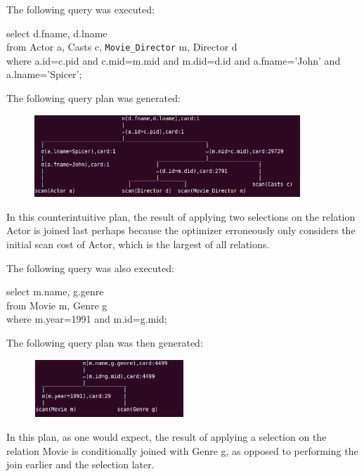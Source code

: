 \documentclass[paper=a4, fontsize=11pt]{scrartcl} %
\numberwithin{equation}{section} %
\numberwithin{figure}{section} %
\numberwithin{table}{section} %
\begin{document}
The following query was executed:

select d.fname, d.lname\\
from Actor a, Casts c, \texttt{Movie\_Director} m, Director d\\
where a.id=c.pid and c.mid=m.mid and m.did=d.id
and a.fname='John' and a.lname='Spicer';

The following query plan was generated:

\begin{figure}[ht!]
\centering
\includegraphics[width=100mm]{queryPlan1.png}
\label{overflow}
\end{figure}

In this counterintuitive plan, the result of applying two selections on the relation Actor is joined last
perhaps because the optimizer erroneously only considers the initial scan cost of Actor, which is the largest
of all relations.

The following query was also executed:

select m.name, g.genre\\
from Movie m, Genre g\\
where m.year=1991 and m.id=g.mid;

The following query plan was then generated:
\begin{figure}[ht!]
\centering
\includegraphics[width=56mm]{queryPlan2.png}
\label{overflow}
\end{figure}

In this plan, as one would expect, the result of applying a selection on the relation Movie
is conditionally joined with Genre g, as opposed to performing the join earlier and the selection later.

\end{document}
